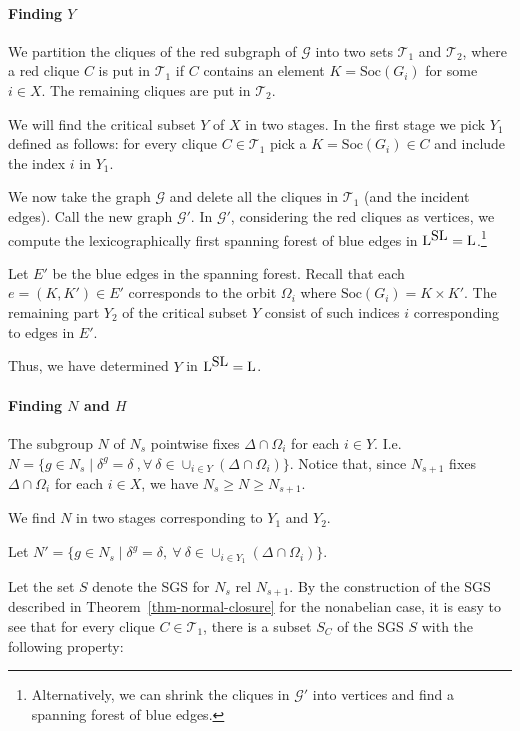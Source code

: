 \documentclass[11pt]{article}
\newcommand{\Lo}{\ensuremath{\mathrm{L}}}
\newcommand{\SL}{\mbox{\rm SL}}
\newcommand{\Soc}[1]{\ensuremath{\mathrm{Soc}\left(#1\right)}}
\begin{document}
\paragraph{Finding $Y$} 
We partition the cliques of the red subgraph of $\mathcal{G}$ into two
sets $\mathcal{T}_1$ and $\mathcal{T}_2$, where a red clique $C$ is
put in $\mathcal{T}_1$ if $C$ contains an element $K=\Soc{G_i}$ for
some $i\in X$. The remaining cliques are put in $\mathcal{T}_2$.

We will find the critical subset $Y$ of $X$ in two stages. In the
first stage we pick $Y_1$ defined as follows: for every clique
$C\in\mathcal{T}_1$ pick a $K=\Soc{G_i}\in C$ and include the index
$i$ in $Y_1$.

We now take the graph $\mathcal{G}$ and delete all the cliques in
$\mathcal{T}_1$ (and the incident edges). Call the new graph
$\mathcal{G}'$. In $\mathcal{G}'$, considering the red cliques as
vertices, we compute the lexicographically first spanning forest of
blue edges in $\Lo^{\SL}=\Lo$.\footnote{Alternatively, we can shrink
the cliques in $\mathcal{G}'$ into vertices and find a spanning forest
of blue edges.}

Let $E'$ be the blue edges in the spanning forest. Recall that each
$e=(K,K')\in E'$ corresponds to the orbit $\Omega_i$ where
$\Soc{G_i}=K\times K'$. The remaining part $Y_2$ of the critical
subset $Y$ consist of such indices $i$ corresponding to edges in $E'$.

Thus, we have determined $Y$ in $\Lo^{\SL}=\Lo$.

\paragraph{Finding $N$ and $H$}
The subgroup $N$ of $N_s$ pointwise fixes $\Delta\cap\Omega_i$ for
each $i\in Y$. I.e.\ $N=\{g\in N_s\mid \delta^g=\delta~,
\forall~\delta\in\cup_{i\in Y}(\Delta\cap\Omega_i)\}$. Notice that,
since $N_{s+1}$ fixes $\Delta\cap\Omega_i$ for each $i\in X$, we have
$N_s\geq N\geq N_{s+1}$. 

We find $N$ in two stages corresponding to $Y_1$ and $Y_2$.

Let $N'=\{g\in N_s\mid \delta^g=\delta, ~\forall~\delta\in\cup_{i\in
Y_1}(\Delta\cap\Omega_i)\}$.

Let the set $S$ denote the SGS for $N_s$ rel $N_{s+1}$. By the
construction of the SGS described in Theorem~\ref{thm-normal-closure}
for the nonabelian case, it is easy to see that for every clique
$C\in\mathcal{T}_1$, there is a subset $S_C$ of the SGS $S$ with the
following property:
\end{document}
